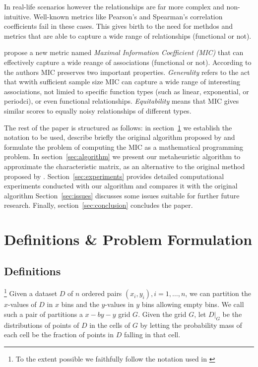 \documentclass[12pt]{article}
\begin{document}
In real-life scenarios however the relationships are far more complex and non-intuitive.
Well-known metrics like Pearson's and Spearman's correlation coefficients fail in these cases.
This gives birth to the need for methdos and metrics that are able to capture a wide range of relationships
(functional or not).

\cite{reshef2011detecting} propose a new metric named {\it Maximal Information Coefficient (MIC)}
that can effectively capture a wide reange of associations (functional or not).
According to the authors MIC preserves two important properties.
{\it Generality} refers to the act that wwith sufficient sample size MIC can capture a wide range of interesting associations,
not limied to specific function types (such as linear, exponential, or periodci), or even functional relationships.
{\it Equitability} means that MIC gives similar scores to equally noisy relationships of different types.

\cite{cho2012human, koren2012host, speed2011correlation}

The rest of the paper is structured as follows:
in section~\ref{sec:formulation} we establish the notation to be used,
describe briefly the original algorithm proposed by \cite{reshef2011detecting}
and formulate the problem of computing the MIC as a mathematical programming problem.
In section~\ref{sec:algorithm} we present our metaheuristic algorithm to approximate the characteristic matrix,
as an alternative to the original method proposed by \cite{reshef2011detecting}.
Section~\ref{sec:experiments} provides detailed computational experiments
conducted with our algorithm and compares it with the original algorithm
Section~\ref{sec:issues} discusses some issues suitable for further future research.
Finally, section~\ref{sec:conclusion} concludes the paper.




\section{Definitions \& Problem Formulation}
\label{sec:formulation}
\subsection{Definitions}
\footnote{To the extent possible we faithfully follow the notation used in \cite{reshef2011detecting}}
Given a dataset $D$ of $n$ ordered pairs $(x_i,y_i), i=1,\ldots,n$,
we can partition the $x$-values of $D$ in $x$ bins and the $y$-values in $y$ bins allowing empty bins.
We call such a pair of partitions a $x-by-y$ grid $G$. Given the grid $G$, let $D|_G$ be the distributions of points of $D$ in the cells of $G$
by letting the probability mass of each cell be the fraction of points in $D$ falling in that cell.
\end{document}

